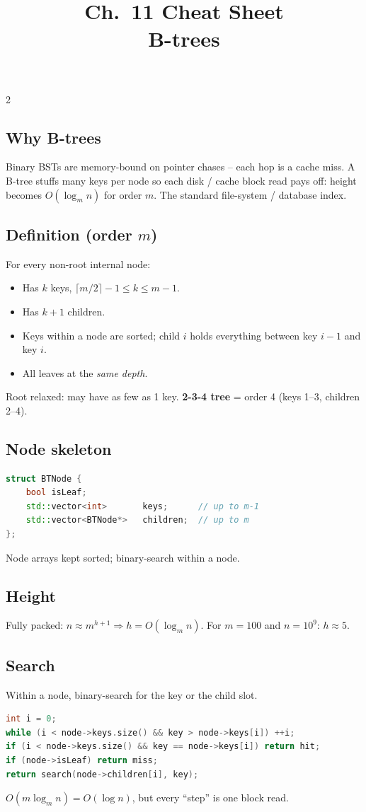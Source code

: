 \documentclass[10pt]{article}
\title{Ch.~11 Cheat Sheet\\\large B-trees}
\author{}
\date{}
\begin{document}
\maketitle
\vspace{-2em}

\begin{multicols}{2}

\subsection*{Why B-trees}
Binary BSTs are memory-bound on pointer chases -- each hop is a
cache miss. A B-tree stuffs many keys per node so each disk / cache
block read pays off: height becomes $O(\log_m n)$ for order $m$.
The standard file-system / database index.

\subsection*{Definition (order $m$)}
For every non-root internal node:
\begin{itemize}
    \item Has $k$ keys, $\lceil m/2 \rceil - 1 \le k \le m - 1$.
    \item Has $k+1$ children.
    \item Keys within a node are sorted; child $i$ holds everything
    between key $i-1$ and key $i$.
    \item All leaves at the \emph{same depth}.
\end{itemize}
Root relaxed: may have as few as 1 key. \textbf{2-3-4 tree} = order 4
(keys 1--3, children 2--4).

\subsection*{Node skeleton}
\begin{lstlisting}[language=C++]
struct BTNode {
    bool isLeaf;
    std::vector<int>       keys;      // up to m-1
    std::vector<BTNode*>   children;  // up to m
};
\end{lstlisting}
Node arrays kept sorted; binary-search within a node.

\subsection*{Height}
Fully packed: $n \approx m^{h+1} \Rightarrow h = O(\log_m n)$.
For $m = 100$ and $n = 10^9$: $h \approx 5$.

\subsection*{Search}
Within a node, binary-search for the key or the child slot.
\begin{lstlisting}[language=C++]
int i = 0;
while (i < node->keys.size() && key > node->keys[i]) ++i;
if (i < node->keys.size() && key == node->keys[i]) return hit;
if (node->isLeaf) return miss;
return search(node->children[i], key);
\end{lstlisting}
$O(m \log_m n) = O(\log n)$, but every ``step'' is one block read.


\end{multicols}
\end{document}
